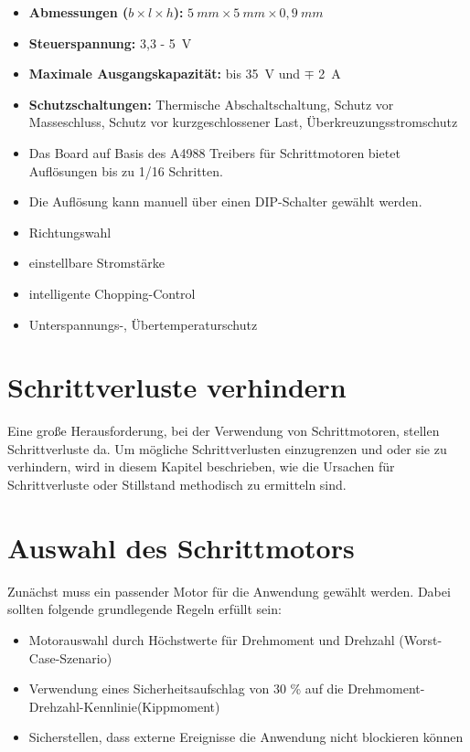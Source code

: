 {{{\begin{itemize}
  \item \textbf{Abmessungen ($b \times l \times h$):} $5 \ mm \times 5 \ mm \times 0,9 \ mm$
  \item \textbf{Steuerspannung:} 3,3 - 5\ V
  \item \textbf{Maximale Ausgangskapazität:} bis 35\ V und $\mp$ 2\ A
  \item \textbf{Schutzschaltungen:}  Thermische Abschaltschaltung, Schutz vor Masseschluss, Schutz vor kurzgeschlossener Last, Überkreuzungsstromschutz \cite{Allegro:2022}
  \item Das Board auf Basis des A4988 Treibers für Schrittmotoren bietet Auflösungen bis zu 1/16 Schritten. 
  \item Die Auflösung kann manuell über einen DIP-Schalter gewählt werden.
  \item Richtungswahl
  \item einstellbare Stromstärke
  \item intelligente Chopping-Control
  \item  Unterspannungs-, Übertemperaturschutz
\end{itemize}





\section{Schrittverluste verhindern}

Eine große Herausforderung, bei der Verwendung von Schrittmotoren, stellen Schrittverluste da. Um mögliche Schrittverlusten einzugrenzen und oder sie zu verhindern, wird in diesem Kapitel beschrieben, wie die Ursachen für Schrittverluste oder Stillstand methodisch zu ermitteln sind. \cite{Faulhaber:2020}

\section{Auswahl des Schrittmotors}
Zunächst muss ein passender Motor für die Anwendung gewählt werden. Dabei sollten folgende grundlegende Regeln erfüllt sein:
\begin{itemize}
	\item Motorauswahl durch Höchstwerte für Drehmoment und Drehzahl (Worst-Case-Szenario)
	\item Verwendung eines Sicherheitsaufschlag von 30 \% auf die Drehmoment-Drehzahl-Kennlinie(Kippmoment)
	\item Sicherstellen, dass externe Ereignisse die Anwendung nicht blockieren können
\end{itemize}

}}}
